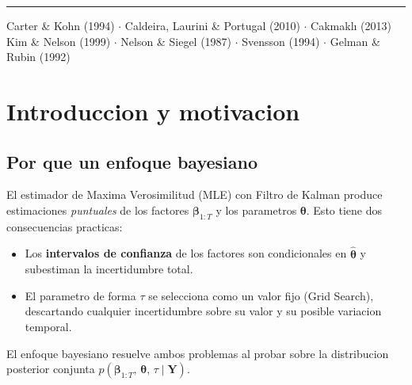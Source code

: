 \documentclass[12pt, a4paper]{article}
\theoremstyle{plain}
\theoremstyle{definition}
\theoremstyle{remark}
\newcommand{\bbet}{\bm{\beta}}
\newcommand{\bY}{\mathbf{Y}}
\begin{document}
\begin{titlepage}
\begin{center}
\vspace{2cm}
\rule{\textwidth}{0.4pt}
\vspace{0.4cm}

{\small\sffamily\color{azulclaro}
  Carter \& Kohn (1994) $\cdot$
  Caldeira, Laurini \& Portugal (2010) $\cdot$
  Cakmaklı (2013)\\
  Kim \& Nelson (1999) $\cdot$
  Nelson \& Siegel (1987) $\cdot$
  Svensson (1994) $\cdot$
  Gelman \& Rubin (1992)
}
\end{center}
\end{titlepage}

\nopagecolor
\color{black}

\tableofcontents
\newpage

\section{Introduccion y motivacion}

\subsection{Por que un enfoque bayesiano}

El estimador de Maxima Verosimilitud (MLE) con Filtro de Kalman produce
estimaciones \emph{puntuales} de los factores $\bbet_{1:T}$ y los
parametros $\bm{\theta}$. Esto tiene dos consecuencias practicas:

\begin{itemize}[leftmargin=1.5em]
  \item Los \textbf{intervalos de confianza} de los factores son condicionales
        en $\hat{\bm{\theta}}$ y subestiman la incertidumbre total.
  \item El parametro de forma $\tau$ se selecciona como un valor fijo
        (Grid Search), descartando cualquier incertidumbre sobre su valor
        y su posible variacion temporal.
\end{itemize}

El enfoque bayesiano resuelve ambos problemas al probar sobre la distribucion
posterior conjunta $p(\bbet_{1:T},\,\bm{\theta},\,\tau \mid \bY)$.
\end{document}
